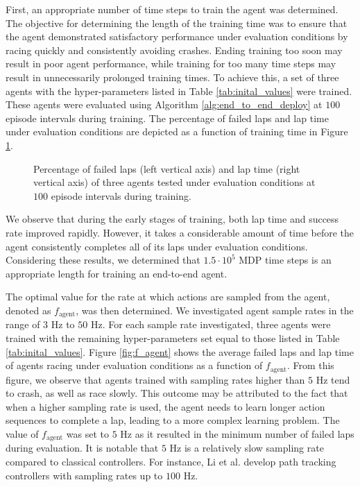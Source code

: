 First, an appropriate number of time steps to train the agent was determined.
The objective for determining the length of the training time was to ensure that the agent demonstrated satisfactory performance under evaluation conditions by racing quickly and consistently avoiding crashes. 
Ending training too soon may result in poor agent performance, while training for too many time steps may result in unnecessarily prolonged training times. 
To achieve this, a set of three agents with the hyper-parameters listed in Table \ref{tab:inital_values} were trained.
These agents were evaluated using Algorithm \ref{alg:end_to_end_deploy} at $100$ episode intervals during training.
The percentage of failed laps and lap time under evaluation conditions are depicted as a function of training time in Figure \ref{fig:MDP_steps}. 

\begin{figure}[htb!]
    \centering
    
    \caption[Percentage failed laps and lap time of an end-to-end agent during training]{Percentage of failed laps (left vertical axis) and lap time (right vertical axis) of three agents tested under evaluation conditions at $100$ episode intervals during training.}
    \label{fig:MDP_steps}
\end{figure}

We observe that during the early stages of training, both lap time and success rate improved rapidly. 
However, it takes a considerable amount of time before the agent consistently completes all of its laps under evaluation conditions. 
Considering these results, we determined that $1.5\cdot10^{5}$ MDP time steps is an appropriate length for training an end-to-end agent.



The optimal value for the rate at which actions are sampled from the agent, denoted as $f_{\text{agent}}$, was then determined.
We investigated agent sample rates in the range of $3$ Hz to $50$ Hz.
For each sample rate investigated, three agents were trained with the remaining hyper-parameters set equal to those listed in Table \ref{tab:inital_values}.
Figure \ref{fig:f_agent} shows the average failed laps and lap time of agents racing under evaluation conditions as a function of $f_{\text{agent}}$.  
From this figure, we observe that agents trained with sampling rates higher than $5$ Hz tend to crash, as well as race slowly.
This outcome may be attributed to the fact that when a higher sampling rate is used, the agent needs to learn longer action sequences to complete a lap, leading to a more complex learning problem. 
The value of $f_{\text{agent}}$ was set to $5$ Hz as it resulted in the minimum number of failed laps during evaluation.
It is notable that $5$ Hz is a relatively slow sampling rate compared to classical controllers.
For instance, Li et al. \cite{Li2019} develop path tracking controllers with sampling rates up to $100$ Hz.

